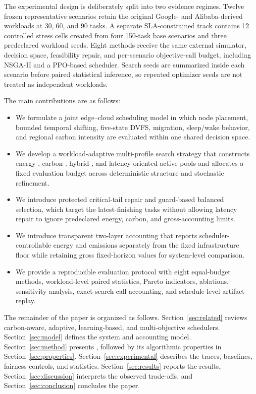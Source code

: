 The experimental design is deliberately split into two evidence regimes. Twelve frozen representative scenarios retain the original Google- and Alibaba-derived workloads at 30, 60, and 90 tasks. A separate SLA-constrained track contains 12 controlled stress cells created from four 150-task base scenarios and three predeclared workload seeds. Eight methods receive the same external simulator, decision space, feasibility repair, and per-scenario objective-call budget, including NSGA-II and a PPO-based scheduler. Search seeds are summarized inside each scenario before paired statistical inference, so repeated optimizer seeds are not treated as independent workloads.

The main contributions are as follows:
\begin{itemize}
    \item We formulate a joint edge--cloud scheduling model in which node placement, bounded temporal shifting, five-state DVFS, migration, sleep/wake behavior, and regional carbon intensity are evaluated within one shared decision space.
    \item We develop a workload-adaptive multi-profile search strategy that constructs energy-, carbon-, hybrid-, and latency-oriented active pools and allocates a fixed evaluation budget across deterministic structure and stochastic refinement.
    \item We introduce protected critical-tail repair and guard-based balanced selection, which target the latest-finishing tasks without allowing latency repair to ignore predeclared energy, carbon, and gross-accounting limits.
    \item We introduce transparent two-layer accounting that reports scheduler-controllable energy and emissions separately from the fixed infrastructure floor while retaining gross fixed-horizon values for system-level comparison.
    \item We provide a reproducible evaluation protocol with eight equal-budget methods, workload-level paired statistics, Pareto indicators, ablations, sensitivity analysis, exact search-call accounting, and schedule-level artifact replay.
\end{itemize}

The remainder of the paper is organized as follows. Section~\ref{sec:related} reviews carbon-aware, adaptive, learning-based, and multi-objective schedulers. Section~\ref{sec:model} defines the system and accounting model. Section~\ref{sec:method} presents \method, followed by its algorithmic properties in Section~\ref{sec:properties}. Section~\ref{sec:experimental} describes the traces, baselines, fairness controls, and statistics. Section~\ref{sec:results} reports the results, Section~\ref{sec:discussion} interprets the observed trade-offs, and Section~\ref{sec:conclusion} concludes the paper.
